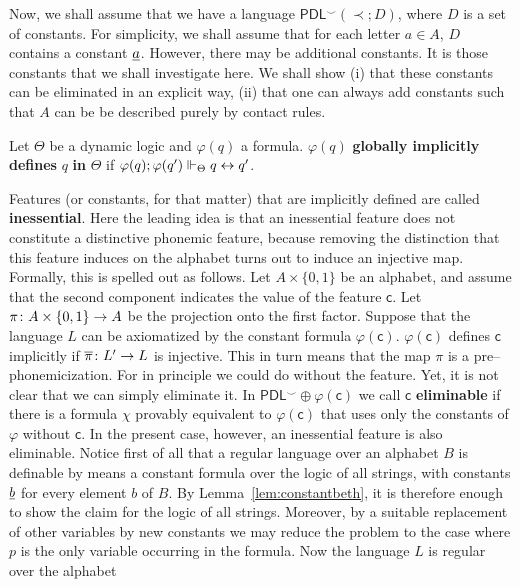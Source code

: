 Now, we shall assume that we have a language
$\mathsf{PDL}^{\smallsmile}(\prec;D)$, where $D$ is a set of
constants. For simplicity, we shall assume that for each letter
$a \in A$, $D$ contains a constant $\underline{a}$. However, there may
be additional constants. It is those constants that we shall 
investigate here. We shall show (i) that these constants can
be eliminated in an explicit way, (ii) that one can always add
constants such that $A$ can be be described purely by contact
rules.
\begin{defn}
Let $\Theta$ be a dynamic logic and $\varphi(q)$ a formula. 
$\varphi(q)$ \textbf{globally implicitly defines} $q$ \textbf{in} 
$\Theta$ if $\varphi(q); \varphi(q') \Vdash_{\Theta} q \leftrightarrow q'$.
\end{defn}
Features (or constants, for that matter) that are implicitly defined
are called \textbf{inessential}. Here the leading idea is that an 
inessential feature does not constitute a distinctive phonemic feature, 
because removing the distinction that this feature induces on the alphabet
turns out to induce an injective map. Formally, this is spelled out
as follows. Let $A \times \{0,1\}$ be an alphabet, and assume that
the second component indicates the value of the feature $\mathsf{c}$. Let
$\pi \colon A \times \{0,1\} \rightarrow A$ be the projection onto the first
factor. Suppose that the language $L$ can be axiomatized by the
constant formula $\varphi(\mathsf{c})$. $\varphi(\mathsf{c})$
defines $\mathsf{c}$ implicitly if $\overline{\pi} \colon  L' \rightarrow L$ is injective.
This in turn means that the map $\pi$ is a pre--phonemicization. For
in principle we could do without the feature.  Yet, it is not clear
that we can simply eliminate it.  In $\mathsf{PDL}^{\smallsmile}
\oplus \varphi(\mathsf{c})$ we call $\mathsf{c}$ \textbf{eliminable} 
if there is a formula $\chi$ provably equivalent to $\varphi(\mathsf{c})$
that uses only the constants of $\varphi$ without $\mathsf{c}$. In the
present case, however, an inessential feature is also eliminable.
Notice first of all that a regular language over an alphabet $B$ is
definable by means a constant formula over the logic of all strings,
with constants $\underline{b}$ for every element $b$ of $B$.
By Lemma~\ref{lem:constantbeth}, it is therefore enough
to show the claim for the logic of all strings. Moreover, by a suitable
replacement of other variables by new constants we may reduce the
problem to the case where $p$ is the only variable occurring in the
formula. Now the language $L$ is regular over the alphabet

